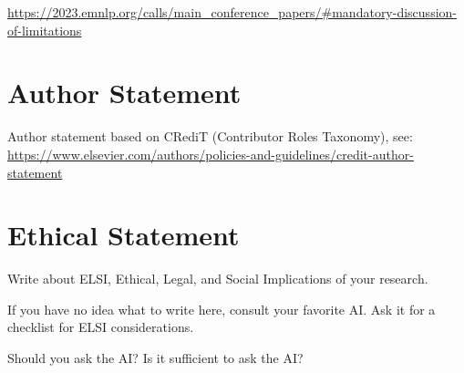 \documentclass[sigconf, review, nonacm]{acmart}
\begin{document}
\url{https://2023.emnlp.org/calls/main_conference_papers/#mandatory-discussion-of-limitations}


\section*{Author Statement}


Author statement based on CRediT (Contributor Roles Taxonomy), see: \url{https://www.elsevier.com/authors/policies-and-guidelines/credit-author-statement}


\section*{Ethical Statement}

Write about ELSI, \ie Ethical, Legal, and Social Implications of your research.

\begin{tcolorbox}[title=Instructions: How to write an ELSI statement?]
If you have no idea what to write here, consult your favorite AI. Ask it for a checklist for ELSI considerations. 

Should you ask the AI?
Is it sufficient to ask the AI?
\end{tcolorbox}
\end{document}
